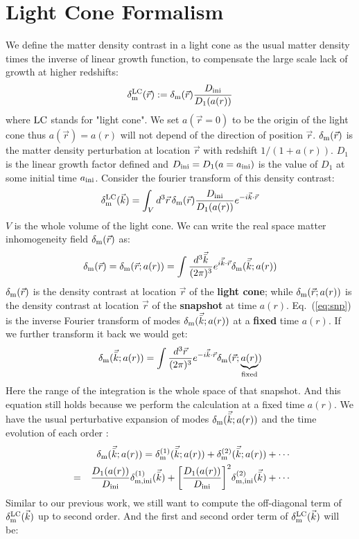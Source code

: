 \documentclass[prd,amsmath,amssymb,floatfix,superscriptaddress,nofootinbib,twocolumn]{revtex4-1}
\def\be{\begin{equation}}
\def\ee{\end{equation}}
\def\bea{\begin{eqnarray}}
\def\eea{\end{eqnarray}}
\newcommand{\LC}{\rm LC}
\newcommand{\ini}{\rm ini}
\newcommand{\vbk}{\vec{\bar{k}}}
\newcommand{\vrr}{\vec{r}}
\newcommand{\vs}{\nonumber\\}
\newcommand{\vk}{\vec{k}}
\newcommand{\ec}[1]{Eq.~(\ref{eq:#1})}
\newcommand{\eql}[1]{\label{eq:#1}}
\begin{document}
\section{Light Cone Formalism} \label{sec2}
We define the matter density contrast in a light cone as the usual matter density times the inverse of linear growth function, to compensate the large scale lack of growth at higher redshifts:
\be
\delta^{\LC}_{\rm m}(\vrr) :=\delta_{\rm m}(\vrr) \frac{D_{\ini}}{D_{1}(a(r))} \eql{LC}
\ee
where $\LC$ stands for "light cone". We set $a(\vrr=0)$ to be the origin of the light cone thus $a(\vrr)=a(r)$ will not depend of the direction of position $\vrr$. $\delta_{\rm m}(\vrr)$ is the matter density perturbation at location $\vrr$ with redshift $1/(1+a(r))$. $D_1$ is the linear growth factor defined and $D_{\ini} = D_1(a=a_{\ini})$ is the value of $D_1$ at some initial time $a_{\rm ini}$. Consider the fourier transform of this density contrast:
\be
\delta^{\LC}_{\rm m}(\vk) =\int_{V} d^3\vrr  \, \delta_{\rm m}(\vrr) \frac{D_{\ini}}{D_{1}(a(r))}  e^{-i\vk \cdot\vrr} \eql{LCM}
\ee
$V$ is the whole volume of the light cone. We can write the real space matter inhomogeneity field $\delta_{\rm m}(\vrr)$ as:
\be 
\delta_{\rm m}(\vrr)=\delta_{\rm m}(\vrr;a(r))=\int \frac{d^3 \vbk}{(2\pi)^3}e^{i\vbk\cdot\vrr}\delta_{\rm m}(\vbk;a(r))\eql{snp}
\ee 
$\delta_{\rm m}(\vrr)$ is the density contrast at location $\vrr$ of the \textbf{light cone}; while $\delta_{\rm m}(\vrr;a(r))$ is the density contrast at location $\vrr$ of the \textbf{snapshot} at time $a(r)$. \ec{snp} is the inverse Fourier transform of modes $\delta_{\rm m}(\vbk;a(r))$ at a \textbf{fixed} time $a(r)$. If we further transform it back we would get:
\be 
\delta_{\rm m}(\vbk;a(r))=\int \frac{d^3 \vrr}{(2\pi)^3}e^{-i\vbk\cdot\vrr}\delta_{\rm m}(\vrr;\underbrace{a(r)}_{\rm fixed})
\ee 
Here the range of the integration is the whole space of that snapshot. And this equation still holds because we perform the calculation at a fixed time $a(r)$. We have the usual perturbative expansion of modes $\delta_{\rm m}(\vbk;a(r))$ and the time evolution of each order \cite{Bernardeau:2002rev}:
\bea
&&\delta_{\rm m}(\vbk;a(r))=\delta^{(1)}_{\rm m}(\vbk;a(r))+\delta^{(2)}_{\rm m}(\vbk;a(r))+\cdots\vs
&=&\frac{D_1(a(r))}{D_{\rm ini}}\delta^{(1)}_{\rm m,ini}(\vbk)+\bigg[\frac{D_1(a(r))}{D_{\rm ini}}\bigg]^2\delta^{(2)}_{\rm m,ini}(\vbk)+\cdots
\eea 
Similar to our previous work, we still want to compute the off-diagonal term of $\delta^{\LC}_{\rm m}(\vk)$ up to second order. And the first and second order term of $\delta^{\LC}_{\rm m}(\vk)$ will be:
\end{document}
